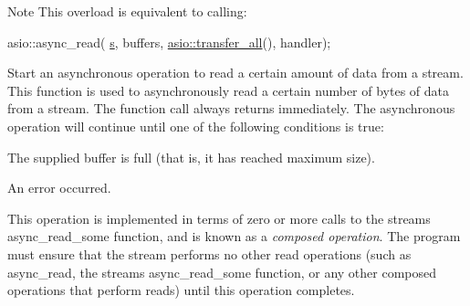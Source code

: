 \begin{DoxyNote}{Note}
This overload is equivalent to calling\+: 
\begin{DoxyCode}
asio::async\_read(
   \hyperlink{group__async__connect_ga31ab74b9ea6c77932dddd016cfc7920a}{s}, buffers,
   \hyperlink{group__completion__condition_ga4a82e92df79aa8401a8bc2117d4cf900}{asio::transfer\_all}(),
   handler); 
\end{DoxyCode}

\end{DoxyNote}
Start an asynchronous operation to read a certain amount of data from a stream. This function is used to asynchronously read a certain number of bytes of data from a stream. The function call always returns immediately. The asynchronous operation will continue until one of the following conditions is true\+:

\begin{DoxyItemize}
\item The supplied buffer is full (that is, it has reached maximum size).\end{DoxyItemize}
\begin{DoxyItemize}
\item An error occurred.\end{DoxyItemize}
This operation is implemented in terms of zero or more calls to the stream\textquotesingle{}s async\+\_\+read\+\_\+some function, and is known as a {\itshape composed operation}. The program must ensure that the stream performs no other read operations (such as async\+\_\+read, the stream\textquotesingle{}s async\+\_\+read\+\_\+some function, or any other composed operations that perform reads) until this operation completes.


